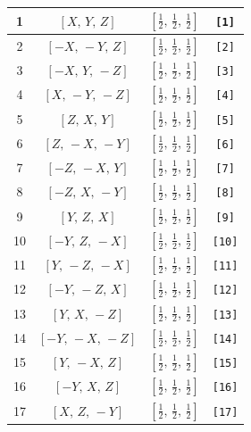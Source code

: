 \documentclass[fleqn,8pt]{jsarticle}
\begin{document}
\begin{longtable}{cccc}
1 & $\left[ X,\, Y,\, Z \right]$ & $\left[ \frac{1}{2},\, \frac{1}{2},\, \frac{1}{2} \right]$ & {\tt [1]} \\ \hline
2 & $\left[ - X,\, - Y,\, Z \right]$ & $\left[ \frac{1}{2},\, \frac{1}{2},\, \frac{1}{2} \right]$ & {\tt [2]} \\ \hline
3 & $\left[ - X,\, Y,\, - Z \right]$ & $\left[ \frac{1}{2},\, \frac{1}{2},\, \frac{1}{2} \right]$ & {\tt [3]} \\ \hline
4 & $\left[ X,\, - Y,\, - Z \right]$ & $\left[ \frac{1}{2},\, \frac{1}{2},\, \frac{1}{2} \right]$ & {\tt [4]} \\ \hline
5 & $\left[ Z,\, X,\, Y \right]$ & $\left[ \frac{1}{2},\, \frac{1}{2},\, \frac{1}{2} \right]$ & {\tt [5]} \\ \hline
6 & $\left[ Z,\, - X,\, - Y \right]$ & $\left[ \frac{1}{2},\, \frac{1}{2},\, \frac{1}{2} \right]$ & {\tt [6]} \\ \hline
7 & $\left[ - Z,\, - X,\, Y \right]$ & $\left[ \frac{1}{2},\, \frac{1}{2},\, \frac{1}{2} \right]$ & {\tt [7]} \\ \hline
8 & $\left[ - Z,\, X,\, - Y \right]$ & $\left[ \frac{1}{2},\, \frac{1}{2},\, \frac{1}{2} \right]$ & {\tt [8]} \\ \hline
9 & $\left[ Y,\, Z,\, X \right]$ & $\left[ \frac{1}{2},\, \frac{1}{2},\, \frac{1}{2} \right]$ & {\tt [9]} \\ \hline
10 & $\left[ - Y,\, Z,\, - X \right]$ & $\left[ \frac{1}{2},\, \frac{1}{2},\, \frac{1}{2} \right]$ & {\tt [10]} \\ \hline
11 & $\left[ Y,\, - Z,\, - X \right]$ & $\left[ \frac{1}{2},\, \frac{1}{2},\, \frac{1}{2} \right]$ & {\tt [11]} \\ \hline
12 & $\left[ - Y,\, - Z,\, X \right]$ & $\left[ \frac{1}{2},\, \frac{1}{2},\, \frac{1}{2} \right]$ & {\tt [12]} \\ \hline
13 & $\left[ Y,\, X,\, - Z \right]$ & $\left[ \frac{1}{2},\, \frac{1}{2},\, \frac{1}{2} \right]$ & {\tt [13]} \\ \hline
14 & $\left[ - Y,\, - X,\, - Z \right]$ & $\left[ \frac{1}{2},\, \frac{1}{2},\, \frac{1}{2} \right]$ & {\tt [14]} \\ \hline
15 & $\left[ Y,\, - X,\, Z \right]$ & $\left[ \frac{1}{2},\, \frac{1}{2},\, \frac{1}{2} \right]$ & {\tt [15]} \\ \hline
16 & $\left[ - Y,\, X,\, Z \right]$ & $\left[ \frac{1}{2},\, \frac{1}{2},\, \frac{1}{2} \right]$ & {\tt [16]} \\ \hline
17 & $\left[ X,\, Z,\, - Y \right]$ & $\left[ \frac{1}{2},\, \frac{1}{2},\, \frac{1}{2} \right]$ & {\tt [17]} \\ \hline

\end{longtable}
\end{document}
